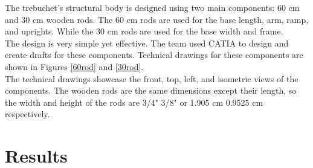 \documentclass[12pt, titlepage]{article}
\begin{document}
    The trebuchet's structural body is designed using two main components: 60 cm and 30 cm wooden
    rods. The 60 cm rods are used for the base length, arm, ramp, and uprights. While 
    the 30 cm rods are used for the base width and frame. \\[10pt]
    The design is very simple yet effective. The team used CATIA to design 
    and create drafts for these components. Technical drawings for these 
    components are shown in Figures \ref{60rod} and \ref{30rod}.\\[10pt]
    The technical drawings showcase the front, top, left, and isometric views of the components.
    The wooden rods are the same dimensions except their length, so the width and height 
    of the rods are 3/4" 3/8" or 1.905 cm 0.9525 cm respectively.
    \newpage
    \section{Results}
\end{document}
